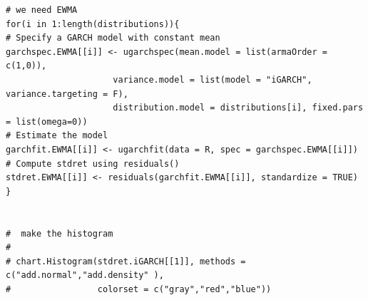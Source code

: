 \documentclass[a4paper,nobind]{templates/ociamthesis}
\newenvironment{Shaded}{\begin{snugshade}}{\end{snugshade}}
\newcommand{\AttributeTok}[1]{\textcolor[rgb]{0.77,0.63,0.00}{#1}}
\newcommand{\CommentTok}[1]{\textcolor[rgb]{0.56,0.35,0.01}{\textit{#1}}}
\newcommand{\DecValTok}[1]{\textcolor[rgb]{0.00,0.00,0.81}{#1}}
\newcommand{\DocumentationTok}[1]{\textcolor[rgb]{0.56,0.35,0.01}{\textbf{\textit{#1}}}}
\newcommand{\FunctionTok}[1]{\textcolor[rgb]{0.00,0.00,0.00}{#1}}
\newcommand{\NormalTok}[1]{#1}
\newcommand{\OtherTok}[1]{\textcolor[rgb]{0.56,0.35,0.01}{#1}}
\newcommand{\SpecialCharTok}[1]{\textcolor[rgb]{0.00,0.00,0.00}{#1}}
\renewenvironment{Shaded}
{
  \vspace{10pt}%
  \begin{snugshade}%
}{%
  \end{snugshade}%
  \vspace{8pt}%
}
\begin{document}
\begin{verbatim}
# we need EWMA
for(i in 1:length(distributions)){
# Specify a GARCH model with constant mean
garchspec.EWMA[[i]] <- ugarchspec(mean.model = list(armaOrder = c(1,0)),
                     variance.model = list(model = "iGARCH", variance.targeting = F),
                     distribution.model = distributions[i], fixed.pars = list(omega=0))
# Estimate the model
garchfit.EWMA[[i]] <- ugarchfit(data = R, spec = garchspec.EWMA[[i]])
# Compute stdret using residuals()
stdret.EWMA[[i]] <- residuals(garchfit.EWMA[[i]], standardize = TRUE)
}


#  make the histogram
# 
# chart.Histogram(stdret.iGARCH[[1]], methods = c("add.normal","add.density" ),
#                 colorset = c("gray","red","blue"))
\end{verbatim}

\begin{Shaded}
\end{Shaded}
\end{document}
